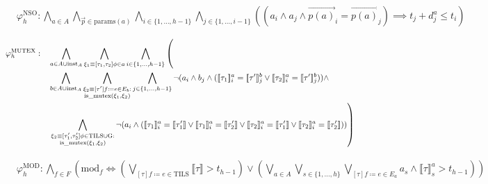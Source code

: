 \documentclass{article}
\begin{document}
\begin{align*}
  &\varphi_{h}^{\text{NSO}}: \bigwedge\limits_{a \in A} \bigwedge\limits_{\overrightarrow{p} \in \text{params}(a)} \bigwedge\limits_{i \in \{ 1, \ldots, h-1 \}} \bigwedge\limits_{j \in \{ 1, \ldots, i-1 \}} \left( \left( a_i \land a_j \land \overrightarrow{p(a)}_i = \overrightarrow{p(a)}_j\right) \implies t_j + d_j^a \leq t_i \right)
\end{align*}

\begin{align*}
  &\varphi_{h}^{\text{MUTEX}}:&&\bigwedge\limits_{a \in A \cup \text{inst}_A} \bigwedge\limits_{\xi_1 \equiv [\tau_1, \tau_2]\phi \in a} \bigwedge\limits_{i \in \{1, \ldots, h-1\}} \left( \vphantom{\bigwedge\limits_{a \in A \cup \text{inst}_A} \bigwedge\limits_{\xi_1 \equiv [\tau_1] \text{ev}_1 \in a} \bigwedge\limits_{i \in \{1, \ldots, h-1\}}} \right.\\ & && \bigwedge\limits_{b \in A \cup \text{inst}_A} \bigwedge\limits_{\substack{\xi_2 \equiv [\tau^\prime]f \coloneqq e \in E_b:\\\text{is\_mutex}(\xi_1,\xi_2)}}\bigwedge\limits_{j \in \{1, \ldots, h-1\}} \neg (a_i \land b_j \land (\llbracket \tau_1 \rrbracket_i^a = \llbracket \tau^\prime \rrbracket_j^b \lor \llbracket \tau_2 \rrbracket_i^a = \llbracket \tau^\prime \rrbracket_j^b)) \land \\& && \left. \bigwedge\limits_{\substack{\xi_2 \equiv [\tau_1^\prime, \tau_2^\prime]\phi \in \text{TILS} \cup \text{G}:\\ \text{is\_mutex}(\xi_1, \xi_2)}} \neg (a_i \land (\llbracket \tau_1 \rrbracket_i^a = \llbracket \tau_1^\prime \rrbracket \lor \llbracket \tau_1 \rrbracket_i^a = \llbracket \tau_2^\prime \rrbracket \lor \llbracket \tau_2 \rrbracket_i^a = \llbracket \tau_1^\prime \rrbracket \lor \llbracket \tau_2 \rrbracket_i^a = \llbracket \tau_2^\prime \rrbracket))\vphantom{\bigwedge\limits_{a \in A \cup \text{inst}_A} \bigwedge\limits_{\text{ev}_1 \equiv [\tau_1] e_1 \in a} \bigwedge\limits_{i \in \{1, \ldots, h-1\}}}\right)
\end{align*}

\begin{align*}
  &\varphi_h^{\text{MOD}}: \bigwedge\limits_{f \in F} \left( \text{mod}_f \iff \left( \bigvee\limits_{[\tau] f \coloneqq e \in \text{TILS}} \llbracket \tau \rrbracket > t_{h-1} \right) \lor \left( \bigvee\limits_{a \in A} \bigvee\limits_{s \in \{ 1, \ldots, h \}} \bigvee\limits_{[\tau] f \coloneqq e \in E_a} a_s \land \llbracket \tau \rrbracket_s^a > t_{h-1} \right) \right)
\end{align*}
\end{document}
